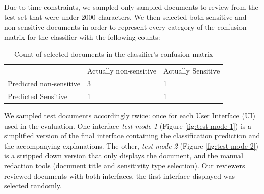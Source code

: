 \documentclass{l4proj}
\begin{document}
Due to time constraints, we sampled only sampled documents to review from the test set that were under 2000 characters.
We then selected both sensitive and non-sensitive documents in order to represent every category of the confusion matrix for the classifier with the following counts:

\begin{table}[H]
    \begin{tabular}{l ll}
                                & Actually non-sensitive & Actually Sensitive \\
        Predicted non-sensitive & 3                      & 1                  \\
        Predicted Sensitive     & 1                      & 1
    \end{tabular}
    \caption{Count of selected documents in the classifier's confusion matrix}
    \label{tab:confusion-matrix-selection}
\end{table}


We sampled test documents accordingly twice: once for each User Interface (UI) used in the evaluation.
One interface \textit{test mode 1} (Figure \ref{fig:test-mode-1}) is a simplified version of the final interface containing the classification prediction and the accompanying explanations.
The other, \textit{test mode 2} (Figure \ref{fig:test-mode-2}) is a stripped down version that only displays the document, and the manual redaction tools (document title and sensitivity type selection).
Our reviewers reviewed documents with both interfaces, the first interface displayed was selected randomly.
\end{document}

